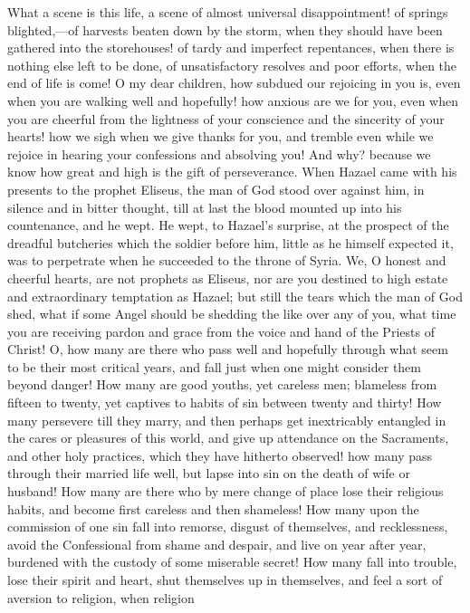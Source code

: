 What a scene is this life, a scene of almost universal
disappointment! of springs blighted,—of harvests beaten down by the
storm, when they should have been gathered into the storehouses! of
tardy and imperfect repentances, when there is nothing else left to be
done, of unsatisfactory resolves and poor efforts, when the end of
life is come! O my dear children, how subdued our rejoicing in you is,
even when you are walking well and hopefully! how anxious are we for
you, even when you are cheerful from the lightness of your conscience
and the sincerity of your hearts! how we sigh when we give thanks for
you, and tremble even while we rejoice in hearing your confessions and
absolving you! And why? because we know how great and high is the gift
of perseverance. When Hazael came with his presents to the prophet
Eliseus, the man of God stood over against him, in silence and in
bitter thought, till at last the blood mounted up into his
countenance, and he wept. He wept, to Hazael's surprise, at the
prospect of the dreadful butcheries which the soldier before him,
little as he himself expected it, was to perpetrate when he succeeded
to the throne of Syria. We, O honest and cheerful hearts, are not
prophets as Eliseus, nor are you destined to high estate and
extraordinary temptation as Hazael; but still the tears which the man
of God shed, what if some Angel should be shedding the like over any
of you, what time you are receiving pardon and grace from the voice
and hand of the Priests of Christ! O, how many are there who pass well
and hopefully through what seem to be their most critical years, and
fall just when one might consider them beyond danger! How many are
good youths, yet careless men; blameless from fifteen to twenty, yet
captives to habits of sin between twenty and thirty! How many
persevere till they marry, and then perhaps get inextricably entangled
in the cares or pleasures of this world, and give up attendance on the
Sacraments, and other holy practices, which they have hitherto
observed! how many pass through their married life well, but lapse
into sin on the death of wife or husband! How many are there who by
mere change of place lose their religious habits, and become first
careless and then shameless! How many upon the commission of one sin
fall into remorse, disgust of themselves, and recklessness, avoid the
Confessional from shame and despair, and live on year after year,
burdened with the custody of some miserable secret! How many fall into
trouble, lose their spirit and heart, shut themselves up in
themselves, and feel a sort of aversion to religion, when religion
